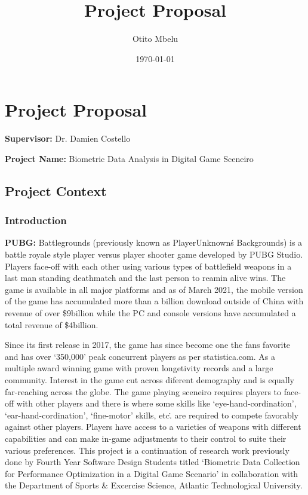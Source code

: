 \documentclass{report}
\title{Project Proposal}
\author{Otito Mbelu}
\date{\today}
\begin{document}
\setlength{\parindent}{0pt}
\maketitle

\chapter*{Project Proposal}
    \textbf{Supervisor:} Dr. Damien Costello \par
    \textbf{Project Name:} Biometric Data Analysis in Digital Game Sceneiro
    \section*{Project Context}
    \subsection*{Introduction}
    \par
    \textbf{PUBG:} Battlegrounds (previously known as PlayerUnknown\'s Backgrounds) is a battle royale style player versus
    player shooter game developed by PUBG Studio. Players face-off with each other using various types of battlefield weapons
    in a last man standing deathmatch and the last person to reamin alive wins. The game is available in all major platforms
    and as of March 2021, the mobile version of the game has accumulated more than a billion download outside of China with 
    revenue of over \$9billion while the PC and console versions have accumulated a total revenue of \$4billion.
    \par 
    Since its first release in 2017, the game has since become one the fans favorite and has over `350,000' peak concurrent 
    players as per statistica.com. As a multiple award winning game with proven longetivity records and a large community.
    Interest in the game cut across diferent demography and is equally far-reaching across the globe. 
    The game playing sceneiro requires players to face-off with other players and there is where some skills like 
    `eye-hand-cordination', `ear-hand-cordination', `fine-motor' skills, etc\.. are required to compete favorably against 
    other players. Players have access to a varieties of weapons with different capabilities and can make in-game adjustments
    to their control to suite their various preferences. 
    This project is a continuation of research work previously done by Fourth Year Software Design Students titled `Biometric 
    Data Collection for Performance Optimization in a Digital Game Scenario' in collaboration with the Department of Sports
     \& Excercise Science, Atlantic Technological University.
\end{document}
